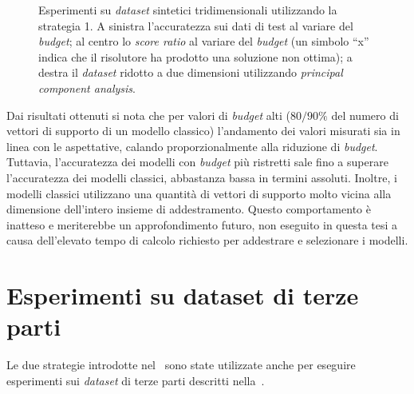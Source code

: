 \begin{figure}
\begin{subfigure}{\textwidth}
    \end{subfigure}%
\caption[Esperimenti su \emph{dataset} sintetici tridimensionali utilizzando la strategia 1.]{Esperimenti su \emph{dataset} sintetici tridimensionali utilizzando la strategia 1. A sinistra l'accuratezza sui dati di test al variare del \emph{budget}; al centro lo \emph{score ratio} al variare del \emph{budget} (un simbolo ``x'' indica che il risolutore ha prodotto una soluzione non ottima); a destra il \emph{dataset} ridotto a due dimensioni utilizzando \emph{principal component analysis}.}
\label{fig:3d_exp}
\end{figure}
Dai risultati ottenuti si nota che per valori di \emph{budget} alti ($80/90\%$ del numero di vettori di supporto di un modello classico) l'andamento dei valori misurati sia in linea con le aspettative, calando proporzionalmente alla riduzione di \emph{budget}.
Tuttavia, l'accuratezza dei modelli con \emph{budget} più ristretti sale fino a superare l'accuratezza dei modelli classici, abbastanza bassa in termini assoluti.
Inoltre, i modelli classici utilizzano una quantità di vettori di supporto molto vicina alla dimensione dell'intero insieme di addestramento.
Questo comportamento è inatteso e meriterebbe un approfondimento futuro, non eseguito in questa tesi a causa dell'elevato tempo di calcolo richiesto per addestrare e selezionare i modelli.

\section{Esperimenti su dataset di terze parti}\label{sec:exp:real_ds}
Le due strategie introdotte nel~ sono state utilizzate anche per eseguire esperimenti sui \emph{dataset} di terze parti descritti nella~.


